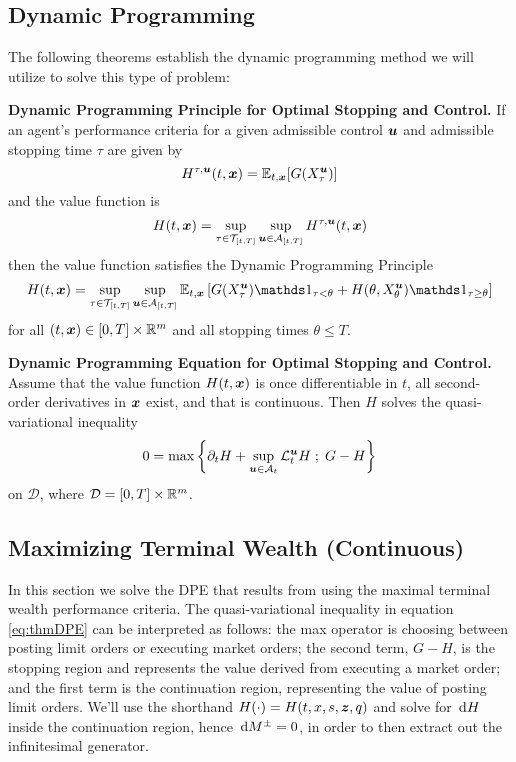 \subsection{Dynamic Programming}
The following theorems establish the dynamic programming method we will utilize to solve this type of problem:
\begin{thm} \textbf{Dynamic Programming Principle for Optimal Stopping and Control.}
If an agent's performance criteria for a given admissible control $\bm{u}$ and admissible stopping time $\tau$ are given by
\[ H^{\tau, \bm{u}}(t,\bm{x}) = \mathbb{E}_{t,\bm{x}} [ G (X^{\bm{u}}_\tau)] \]
and the value function is
\[ H(t,\bm{x}) = \sup\limits_{\tau \in \mathcal{T}_{[t,T]}} \sup\limits_{\bm{u} \in \mathcal{A}_{[t,T]}} H^{\tau, \bm{u}}(t,\bm{x}) \]
then the value function satisfies the Dynamic Programming Principle
\begin{equation}\label{eq:thmDPP}
H(t,\bx) = \sup\limits_{\tau \in \mathcal{T}_{[t,T]}} \sup\limits_{\bu \in \cA_{[t,T]}} \E_{t,\bx} \left[ G (X^{\bu}_\tau) \indicator_{\tau<\theta} + H(\theta, X^{\bu}_\theta)\indicator_{\tau \geq \theta} \right]
\end{equation}
for all $(t,\bm{x}) \in [0,T] \times \mathbb{R}^m$ and all stopping times $\theta \leq T$.
\end{thm}
\begin{thm} \textbf{Dynamic Programming Equation for Optimal Stopping and Control.}
Assume that the value function $H(t,\bm{x})$ is once differentiable in $t$, all second-order derivatives in $\bm{x}$ exist, and that  is continuous. Then $H$ solves the quasi-variational inequality
\begin{equation}\label{eq:thmDPE}
0 = \max \left\lbrace \partial_t H + \sup \limits_{\bm{u} \in \mathcal{A}_t} \mathcal{L}^{\bm{u}}_t H \; ; \; G - H \right\rbrace
\end{equation}
on $\mathcal{D}$, where $\mathcal{D} = [0,T] \times \mathbb{R}^m$.
\end{thm}

\subsection{Maximizing Terminal Wealth (Continuous)}
In this section we solve the DPE that results from using the maximal terminal wealth performance criteria. The quasi-variational inequality in equation \ref{eq:thmDPE} can be interpreted as follows: the max operator is choosing between posting limit orders or executing market orders; the second term, $G-H$, is the stopping region and represents the value derived from executing a market order; and the first term is the continuation region, representing the value of posting limit orders. We'll use the shorthand $H(\cdot) = H(t,x,s,\bm{z},q)$ and solve for $\,\mathrm{d} H$ inside the continuation region, hence $\,\mathrm{d} M^{\pm} = 0$, in order to then extract out the infinitesimal generator.

